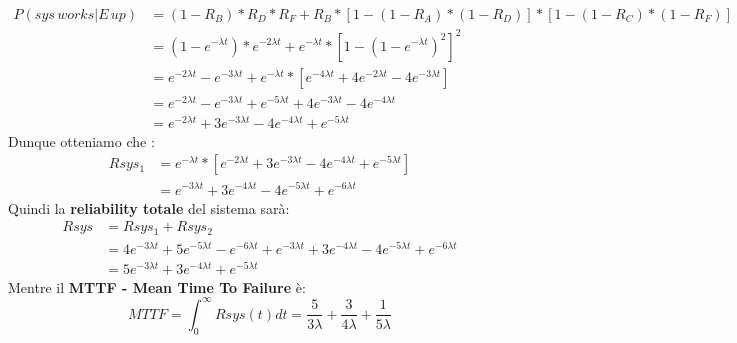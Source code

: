 \begin{equation*}
	\begin{split}
	P(sys\,works|E\,up) &= (1-R_B)*R_D*R_F + R_B*[1-(1-R_A)*(1-R_D)]*[1-(1-R_C)*(1-R_F)]  \\
	&= (1-e^{-\lambda t})*e^{-2\lambda t} + e^{-\lambda t}*[1-(1-e^{-\lambda t})^{2}]^{2} \\
	&= e^{-2\lambda t} - e^{-3\lambda t} + e^{-\lambda t}*[e^{-4\lambda t}+4e^{-2\lambda t}-4e^{-3\lambda t}] \\
	&= e^{-2\lambda t} - e^{-3\lambda t} + e^{-5\lambda t}+4e^{-3\lambda t}-4e^{-4\lambda t} \\
	&= e^{-2\lambda t} + 3e^{-3\lambda t} -4e^{-4\lambda t} +e^{-5\lambda t} 
	\end{split}
\end{equation*}
Dunque otteniamo che :
\begin{equation*}
	\begin{split}
		Rsys_1 &= e^{-\lambda t}*[e^{-2\lambda t} + 3e^{-3\lambda t} -4e^{-4\lambda t} +e^{-5\lambda t}] \\
		&=  e^{-3\lambda t} + 3e^{-4\lambda t} -4e^{-5\lambda t} +e^{-6\lambda t}
	\end{split}
\end{equation*}
Quindi la \textbf{reliability totale} del sistema sarà:
\begin{equation*}
	\begin{split}
		Rsys &= Rsys_1 + Rsys_2 \\
		&= 4e^{-3\lambda t}+5e^{-5\lambda t}-e^{-6\lambda t} + e^{-3\lambda t} + 3e^{-4\lambda t} -4e^{-5\lambda t} +e^{-6\lambda t} \\
		&= 5e^{-3\lambda t}+3e^{-4\lambda t}+ e^{-5\lambda t}
	\end{split}
\end{equation*}
Mentre il \textbf{MTTF - Mean Time To Failure} è:
\begin{equation*}
	MTTF = \int_{0}^{\infty} Rsys(t)dt = \frac{5}{3\lambda}+\frac{3}{4\lambda}+\frac{1}{5\lambda}
\end{equation*}


